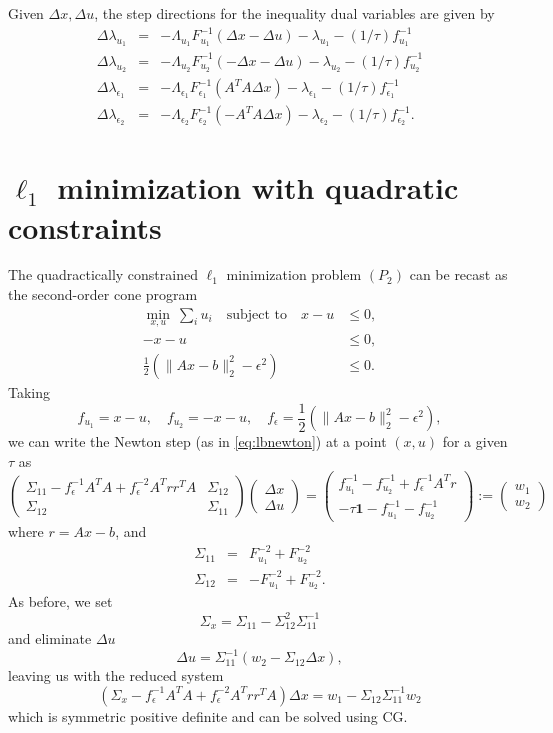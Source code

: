 \documentclass{article}
\newcommand{\bpm}{\left(\begin{matrix}}
\newcommand{\epm}{\end{matrix}\right)}
\newcommand{\dx}{\Delta x}
\newcommand{\du}{\Delta u}
\newcommand{\dlam}{\Delta\lambda}
\newcommand{\<}{\langle}
\renewcommand{\>}{\rangle}
\begin{document}
Given $\dx,\du$, the step directions for the inequality dual variables are given by
\begin{eqnarray*}
\dlam_{u_1} & = & -\Lambda_{u_1} F^{-1}_{u_1}(\dx-\du) - \lambda_{u_1} - (1/\tau)f^{-1}_{u_1} \\
\dlam_{u_2} & = & -\Lambda_{u_2} F^{-1}_{u_2}(-\dx-\du) - \lambda_{u_2} - (1/\tau)f^{-1}_{u_2} \\
\dlam_{\epsilon_1} & = & -\Lambda_{\epsilon_1} F^{-1}_{\epsilon_1}(A^TA\dx) - 
\lambda_{\epsilon_1} - (1/\tau)f^{-1}_{\epsilon_1} \\
\dlam_{\epsilon_2} & = &  -\Lambda_{\epsilon_2} F^{-1}_{\epsilon_2}(-A^TA\dx) - 
\lambda_{\epsilon_2} - (1/\tau)f^{-1}_{\epsilon_2}.
\end{eqnarray*} 



\section{$\ell_1$ minimization with quadratic constraints}
\label{sec:l1qc}

The quadractically constrained $\ell_1$ minimization problem $(P_2)$ can be recast as the second-order cone program
\begin{align*}
\min_{x,u}~\sum_i u_i \quad\text{subject~to}\quad
 x - u & \leq 0, \\[-4mm]
 -x - u & \leq 0, \\
 \frac{1}{2}\left(\|Ax-b\|^2_2 - \epsilon^2\right) & \leq 0.
\end{align*}
Taking
\[
f_{u_1} = x - u,\quad
f_{u_2} = -x -u,\quad
f_\epsilon = \frac{1}{2}\left(\|Ax-b\|^2_2 - \epsilon^2\right),
\]
we can write the Newton step (as in \eqref{eq:lbnewton}) at a point $(x,u)$ for a given $\tau$ as
\[
\bpm \Sigma_{11} - f_\epsilon^{-1}A^TA + f_\epsilon^{-2}A^Trr^TA & \Sigma_{12} \\
\Sigma_{12} & \Sigma_{11} \epm
\bpm \dx \\ \du \epm = 
\bpm
f_{u_1}^{-1} - f_{u_2}^{-1} + f_\epsilon^{-1}A^Tr \\
-\tau\mathbf{1} - f_{u_1}^{-1} - f_{u_2}^{-1}
\epm :=
\bpm w_1 \\ w_2 \epm
\]
where $r = Ax-b$, and
\begin{eqnarray*}
\Sigma_{11} & = & F_{u_1}^{-2} + F_{u_2}^{-2} \\
\Sigma_{12} & = & -F_{u_1}^{-2} + F_{u_2}^{-2}.
\end{eqnarray*}
As before, we set
\[
\Sigma_x = \Sigma_{11} - \Sigma_{12}^2\Sigma_{11}^{-1}
\]
and eliminate $\du$
\[
\du = \Sigma_{11}^{-1}(w_2 - \Sigma_{12}\dx),
\]
leaving us with the reduced system
\[
(\Sigma_x - f_\epsilon^{-1}A^TA + f_\epsilon^{-2}A^Trr^TA)\dx = 
w_1 - \Sigma_{12}\Sigma_{11}^{-1}w_2
\]
which is symmetric positive definite and can be solved using CG.  
\end{document}
